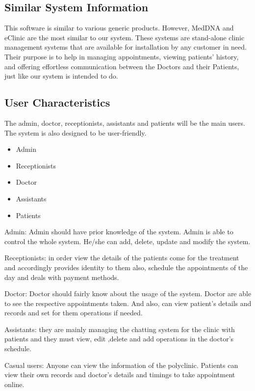 \documentclass[]{article}
\begin{document}
\subsection{Similar System Information}
This software is similar to various generic products. However, MedDNA and eClinic are the most similar to our system. These systems are stand-alone clinic management systems that are available for installation by any customer in need. Their purpose is to help in managing appointments, viewing patients' history, and offering effortless communication between the Doctors and their Patients, just like our system is intended to do.


\subsection{ User Characteristics}
The admin, doctor, receptionists, assistants and patients will be the main users. The system is also designed to be user-friendly. 

\begin{itemize}
  \item Admin
  \item Receptionists
  \item Doctor
  \item Assistants
  \item Patients
  
  
\end{itemize}

Admin: Admin should have prior knowledge of the system. Admin is able to control the whole system. He/she can add, delete, update and modify the system.


Receptionists: in order view the details of the patients come for the treatment and accordingly provides identity to them also, schedule the appointments of the day and deals with payment methods. 


Doctor: Doctor should fairly know about the usage of the system. Doctor are able to see the respective appointments taken. And also, can view patient’s details and records and set for them operations if needed.


Assistants: they are mainly managing the chatting system for the clinic with patients and they must  view, edit ,delete and add operations in the doctor’s schedule.


Casual users: Anyone can view the information of the polyclinic. Patients can view their own records and doctor’s details and timings to take appointment online.
\end{document}
